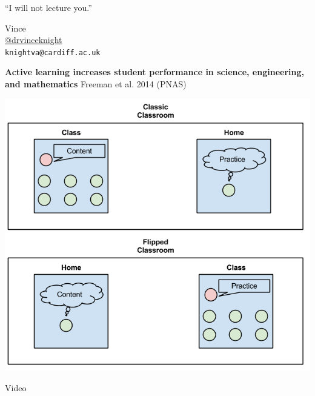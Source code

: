 \documentclass{beamer}
\begin{document}
    \begin{frame}
        \begin{center}
            \Large

            ``I will not lecture you.''

            \normalsize
            \vspace{1cm}
            Vince\\
            \href{https://twitter.com/drvinceknight}{@drvinceknight}\\
            \texttt{knightva@cardiff.ac.uk}
        \end{center}


    \end{frame}

    \begin{frame}
        \begin{center}
            \textbf{Active learning increases student performance in
            science, engineering, and mathematics} Freeman et al. 2014 (PNAS)
        \end{center}
    \end{frame}

    \begin{frame}
        \begin{center}
            \includegraphics[width=.8\textwidth]{./static/flipped_class.png}
        \end{center}
    \end{frame}

    \begin{frame}
        \Huge
        \begin{center}
            Video
        \end{center}
    \end{frame}
\end{document}

